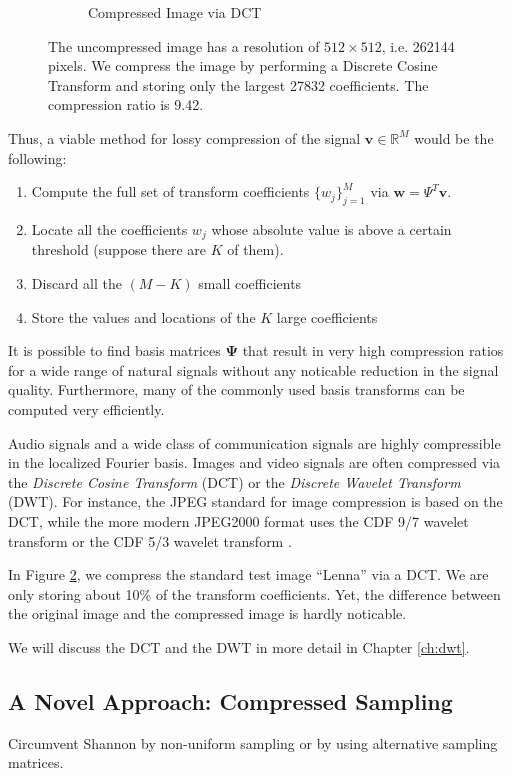 \begin{figure}
\begin{subfigure}[b]{0.4\textwidth}
    \caption{Compressed Image via DCT}
    \label{fig:ch2:lenna_dct}
  \end{subfigure}
  \caption[Image Compression using DCT]{The uncompressed image has a resolution of $512\times 512$, i.e. 262144 pixels. We compress the image by performing a Discrete Cosine Transform and storing only the largest 27832 coefficients. The compression ratio is 9.42.}
  \label{fig:ch2:dct}
\end{figure}

Thus, a viable method for lossy compression of the signal $\bm v \in \mathbb{R}^M$ would be the following:
\begin{enumerate}
\item Compute the full set of transform coefficients $\{w_j\}_{j=1}^M$ via $\bm w = \Psi^T\bm v$.
\item Locate all the coefficients $w_j$ whose absolute value is above a certain threshold (suppose there are $K$ of them). 
\item Discard all the $(M-K)$ small coefficients
\item Store the values and locations of the $K$ large coefficients
\end{enumerate}
It is possible to find basis matrices $\bm\Psi$ that result in very high compression ratios for a wide range of natural signals without any noticable reduction in the signal quality.
Furthermore, many of the commonly used basis transforms can be computed very efficiently.

Audio signals and a wide class of communication signals are highly compressible in the localized Fourier basis.
Images and video signals are often compressed via the \emph{Discrete Cosine Transform} (DCT) or the \emph{Discrete Wavelet Transform} (DWT).
For instance, the JPEG standard for image compression is based on the DCT, while the more modern JPEG2000 format uses the CDF 9/7 wavelet transform or the CDF 5/3 wavelet transform \cite{taubman2012}.

In Figure \ref{fig:ch2:dct}, we compress the standard test image ``Lenna'' via a DCT. 
We are only storing about 10\% of the transform coefficients.
Yet, the difference between the original image and the compressed image is hardly noticable.

We will discuss the DCT and the DWT in more detail in Chapter \ref{ch:dwt}.

\subsection{A Novel Approach: Compressed Sampling}
Circumvent Shannon by non-uniform sampling or by using alternative sampling matrices.


